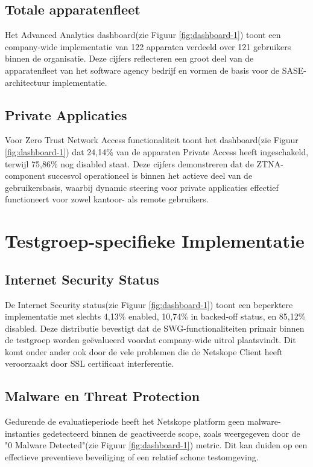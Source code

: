 \subsection{Totale apparatenfleet}
Het Advanced Analytics dashboard(zie Figuur \ref{fig:dashboard-1}) toont een company-wide implementatie van 122 apparaten verdeeld over 121 gebruikers binnen de organisatie. Deze cijfers reflecteren een groot deel van de apparatenfleet van het software agency bedrijf en vormen de basis voor de SASE-architectuur implementatie.

\subsection{Private Applicaties}
Voor Zero Trust Network Access functionaliteit toont het dashboard(zie Figuur \ref{fig:dashboard-1}) dat 24,14\% van de apparaten Private Access heeft ingeschakeld, terwijl 75,86\% nog disabled staat. Deze cijfers demonstreren dat de ZTNA-component succesvol operationeel is binnen het actieve deel van de gebruikersbasis, waarbij dynamic steering voor private applicaties effectief functioneert voor zowel kantoor- als remote gebruikers.

\section{Testgroep-specifieke Implementatie}
\subsection{Internet Security Status}
De Internet Security status(zie Figuur \ref{fig:dashboard-1}) toont een beperktere implementatie met slechts 4,13\% enabled, 10,74\% in backed-off status, en 85,12\% disabled. Deze distributie bevestigt dat de SWG-functionaliteiten primair binnen de testgroep worden geëvalueerd voordat company-wide uitrol plaatsvindt. Dit komt onder ander ook door de vele problemen die de Netskope Client heeft veroorzaakt door SSL certificaat interferentie.

\subsection{Malware en Threat Protection}
Gedurende de evaluatieperiode heeft het Netskope platform geen malware-instanties gedetecteerd binnen de geactiveerde scope, zoals weergegeven door de "0 Malware Detected"(zie Figuur \ref{fig:dashboard-1}) metric. Dit kan duiden op een effectieve preventieve beveiliging of een relatief schone testomgeving.

